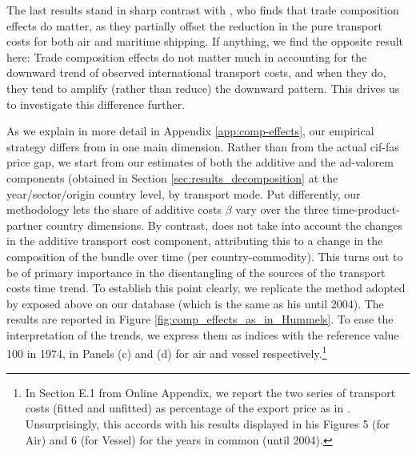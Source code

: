 \documentclass[a4paper,11pt]{article}
\begin{document}
The last results stand in sharp contrast with \cite{hummels2007}, who finds that trade composition effects do matter, as they partially offset the reduction in the pure transport costs for both air and maritime shipping. If anything, we find the opposite result here: Trade composition effects do not matter much in accounting for the downward trend of observed international transport costs, and when they do, they tend to amplify (rather than reduce) the downward pattern. This drives us to investigate this difference further.

As we explain in more detail in Appendix \ref{app:comp-effects}, our empirical strategy differs from \cite{hummels2007} in one main dimension.
Rather than from the actual cif-fas price gap, we start from our estimates of both the additive and the ad-valorem components (obtained in Section \ref{sec:results_decomposition} at the year/sector/origin country level, by transport mode. Put differently, our methodology lets the share of additive costs $\beta$ vary over the three time-product-partner country dimensions. By contrast, \cite{hummels2007} does not take into account the changes in the additive transport cost component, attributing this to a change in the composition of the bundle over time (per country-commodity). This turns out to be of primary importance in the disentangling of the sources of the transport costs time trend. To establish this point clearly, we replicate the method adopted by \cite{hummels2007} exposed above on our database (which is the same as his until 2004). The results are reported in Figure \ref{fig:comp_effects_as_in_Hummels}. To ease the interpretation of the trends, we express them as indices with the reference value 100 in 1974, in Panels (c) and (d) for air and vessel respectively.\footnote{In Section E.1 from Online Appendix, we report the two series of transport costs (fitted and unfitted) as percentage of the export price as in \cite{hummels2007}. Unsurprisingly, this accords with his results displayed in his Figures 5 (for Air) and 6 (for Vessel) for the years in common (until 2004). }
\end{document}
